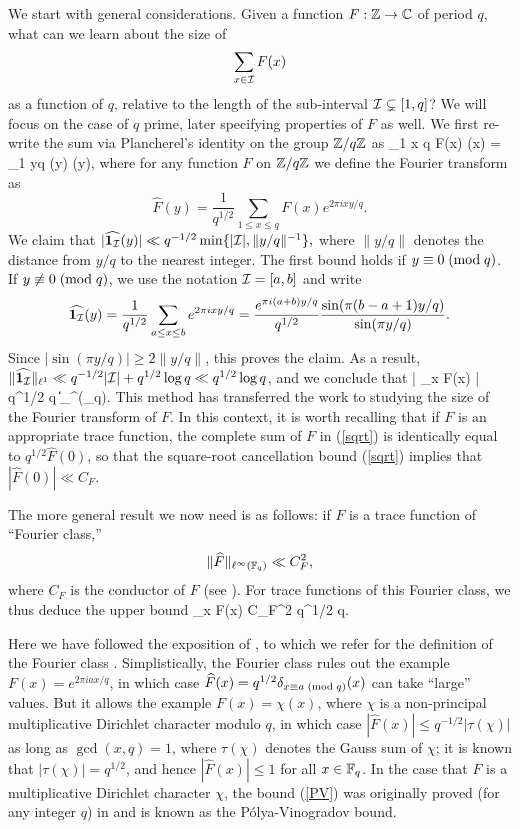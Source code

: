 \documentclass[oneside,11pt]{amsart}
\begin{document}
We start with general considerations.
Given a function $F: \mathbb{Z} \rightarrow \mathbb{C}$ of period $q$, what can we learn about the size of
\[ \sum_{x \in \mathcal{I}} F(x) 
\]
as a function of $q$, relative to the length of the sub-interval $\mathcal{I} \subsetneq [1,q]$?
We will focus on the case of $q$ prime, later specifying properties of  $F$ as well.
We first re-write the sum via Plancherel's identity on the group $\mathbb{Z}/q\mathbb{Z}$ as
\beq\label{Parseval}
 \sum_{1 \leq x \leq q} F(x) \overline{\onebf_{\Ical}}(x) =  \sum_{1 \leq y\leq q} (y) \overline{\widehat{\onebf_{\Ical}}}(y),
 \eeq
where for any function $F$ on $\mathbb{Z}/q\mathbb{Z}$ we define the Fourier transform as
\[ \widehat{F}(y) = \frac{1}{q^{1/2}} \sum_{1 \leq x \leq q} F(x) e^{2\pi i xy/q}.\]
We claim that
$ |\widehat{\boldsymbol1_{\mathcal{I}}}(y) | \ll q^{-1/2}\min\{|\mathcal{I}|, \|y/q\|^{-1}\},$ where $\|y/q\|$ denotes the distance from $y/q$ to the nearest integer.
The first bound holds if $y \equiv 0 \; ( \text{mod} \; q)$. If $y \not\equiv 0 \; ( \text{mod} \; q)$, we use the notation $\mathcal{I} = [a,b]$ and write
\[ 
\widehat{\boldsymbol1_{\mathcal{I}}}(y) =  \frac{1}{q^{1/2}} \sum_{a \leq x \leq b}   e^{2\pi i xy/q} = \frac{e^{\pi i (a+b)y/q}}{q^{1/2}}\frac{\sin (\pi (b-a+1)y/q)}{\sin (\pi y/q)}.
\]
Since $|\sin (\pi y/q)| \geq 2\| y/q\|$, this proves the claim.
As a result, $\| \widehat{\boldsymbol1_{\mathcal{I}}}\|_{\ell^1} \ll q^{-1/2} |\mathcal{I}| + q^{1/2} \log q \ll q^{1/2} \log q$,
and we conclude that 
\beq\label{F_bound}
 | \sum_{x \in \Ical} F(x) | \ll  q^{1/2} \log q  \cdot \|\|_{\ell^\infty (\F_q)}.
 \eeq
This method has transferred the work to studying the size of the Fourier transform of $F$. 
In this context, it is worth recalling that if $F$ is an appropriate trace function,  the complete sum of  $F$ in (\ref{sqrt}) is identically equal to $q^{1/2} \widehat{F}(0)$, so that the square-root cancellation bound (\ref{sqrt}) implies that $|\widehat{F}(0)| \ll C_F $.   

The more general result we now need is as follows: if $F$ is a trace function of ``Fourier class,''  
\[ \| \widehat{F} \|_{\ell^\infty(\mathbb{F}_q)} \ll C_F^2,\]
where $C_F$ is the conductor of $F$ (see \cite[Thm. 5.2]{FKMS19}).
For trace functions of this Fourier class, we thus deduce the   upper bound
\beq\label{PV}
\sum_{x \in \Ical} F(x) \ll C_F^2 q^{1/2} \log q.
\eeq


 
Here we have followed  the exposition of \cite[\S 7.2]{FKMS19}, to which we refer for the definition of the Fourier class  \cite[Dfn. 7.1]{FKMS19}.
Simplistically, the Fourier class rules out the example $F(x) = e^{2\pi i a x/q}$, in which case $\widehat{F}(x) = q^{1/2} \delta_{x \equiv a \; ( \text{mod} \; q)}(x)$ can take ``large'' values. But it allows the example  $F(x) = \chi(x)$, where $\chi$ is a non-principal multiplicative Dirichlet character modulo $q$, in which case $|\widehat{F}(x)| \leq q^{-1/2}|\tau(\chi)|$ as long as $\gcd(x,q)=1$, where $\tau (\chi)$ denotes the Gauss sum of $\chi$; it is known that $|\tau(\chi)| = q^{1/2}$, and hence $ |\widehat{F}(x)| \leq 1$ for all $x \in \mathbb{F}_q$.
In the case that $F$ is a multiplicative Dirichlet character $\chi$,   the bound (\ref{PV}) was originally proved (for any integer $q$) in \cite{Pol18,Vin18} and is known as the P\'olya-Vinogradov bound.
\end{document}
